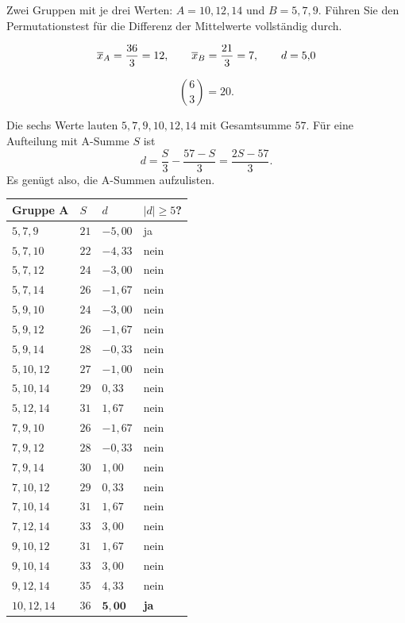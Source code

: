 \begin{aufgabe}
Zwei Gruppen mit je drei Werten: $A = 10, 12, 14$ und $B = 5, 7, 9$. Führen Sie den Permutationstest für die Differenz der Mittelwerte vollständig durch.

\loesung
{}
\[ \overline{x}_A = \frac{36}{3} = 12, \qquad \overline{x}_B = \frac{21}{3} = 7, \qquad d = 5{,}0 \]

\[ \binom{6}{3} = 20 . \]

Die sechs Werte lauten $5, 7, 9, 10, 12, 14$ mit Gesamtsumme $57$. Für eine Aufteilung mit A-Summe $S$ ist
\[ d = \frac{S}{3} - \frac{57-S}{3} = \frac{2S - 57}{3} . \]
Es genügt also, die A-Summen aufzulisten.

\begin{center}
{\small
\renewcommand{\arraystretch}{1.3}
\begin{tabular}{@{}P{2.6cm}P{1.2cm}P{1.6cm}P{1.6cm}@{}}
\toprule
\textbf{Gruppe A} & $S$ & $d$ & $|d| \ge 5$?\\
\midrule
$5,7,9$ & $21$ & $-5{,}00$ & \textcolor{akzent}{ja}\\
$5,7,10$ & $22$ & $-4{,}33$ & nein\\
$5,7,12$ & $24$ & $-3{,}00$ & nein\\
$5,7,14$ & $26$ & $-1{,}67$ & nein\\
$5,9,10$ & $24$ & $-3{,}00$ & nein\\
$5,9,12$ & $26$ & $-1{,}67$ & nein\\
$5,9,14$ & $28$ & $-0{,}33$ & nein\\
$5,10,12$ & $27$ & $-1{,}00$ & nein\\
$5,10,14$ & $29$ & $0{,}33$ & nein\\
$5,12,14$ & $31$ & $1{,}67$ & nein\\
$7,9,10$ & $26$ & $-1{,}67$ & nein\\
$7,9,12$ & $28$ & $-0{,}33$ & nein\\
$7,9,14$ & $30$ & $1{,}00$ & nein\\
$7,10,12$ & $29$ & $0{,}33$ & nein\\
$7,10,14$ & $31$ & $1{,}67$ & nein\\
$7,12,14$ & $33$ & $3{,}00$ & nein\\
$9,10,12$ & $31$ & $1{,}67$ & nein\\
$9,10,14$ & $33$ & $3{,}00$ & nein\\
$9,12,14$ & $35$ & $4{,}33$ & nein\\
$10,12,14$ & $36$ & $\mathbf{5{,}00}$ & \textcolor{akzent}{\textbf{ja}}\\
\bottomrule
\end{tabular}}
\end{center}


\end{aufgabe}
